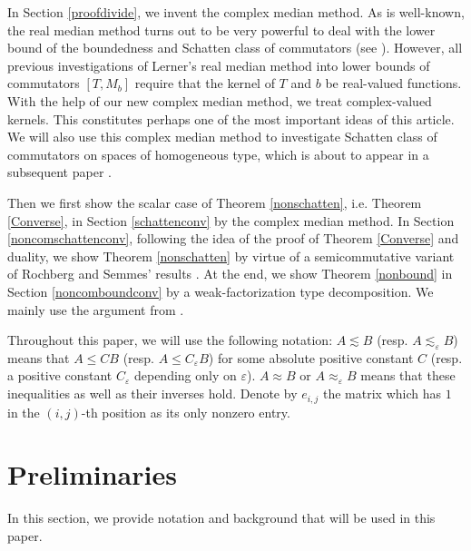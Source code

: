 \documentclass[oneside,english,a4wide]{amsart}
\numberwithin{equation}{section}
\numberwithin{figure}{section}
\theoremstyle{plain}
\theoremstyle{plain}
\theoremstyle{definition}
\theoremstyle{plain}
\theoremstyle{remark}
\theoremstyle{definition}
\theoremstyle{remark}
\theoremstyle{definition}
\newcommand{\8}{\infty}
\begin{document}
 In Section \ref{proofdivide}, we invent the complex median method.   As is well-known, the real median method turns out to be very powerful to deal with the lower bound of the boundedness and Schatten class of commutators (see \cite{LOR,TH3,FLL2023,DGKLWY2021}). However, all previous investigations of Lerner's real median method into lower bounds of commutators $[T,M_b]$ require that the kernel of $T$ and $b$ be real-valued functions. With the help of our new complex median method,  we treat complex-valued kernels. This constitutes perhaps one of the most important ideas of this article. We will also use this complex median method to investigate Schatten class of commutators on spaces of homogeneous type, which is about to appear in a subsequent paper \cite{FWZ2024}.

Then we first show the scalar case of Theorem \ref{nonschatten}, i.e. Theorem \ref{Converse}, in Section \ref{schattenconv} by the complex median method. In Section \ref{noncomschattenconv}, following the idea of the proof of Theorem \ref{Converse} and duality, we show Theorem \ref{nonschatten} by virtue of a semicommutative variant of Rochberg and Semmes' results \cite{RSe}. At the end, we show Theorem \ref{nonbound} in Section \ref{noncomboundconv} by a weak-factorization type decomposition. We mainly use the argument from \cite{TH3}.

Throughout this paper, we will use the following notation: $A\lesssim B$ (resp. $A\lesssim_\varepsilon B$) means that $A\le CB$ (resp. $A\le C_\varepsilon B$) for some absolute positive constant $C$ (resp. a positive constant $C_\varepsilon$ depending only on $\varepsilon$). $A\approx B$ or $A\approx_\varepsilon B$ means that these inequalities as well as their inverses hold.  Denote by $e_{i,j}$ the matrix which has $1$ in the $(i, j)$-th position as its only nonzero entry.

\bigskip

\section{Preliminaries}\label{pre2}


In this section, we provide notation and background that will be used in this paper.
\end{document}

